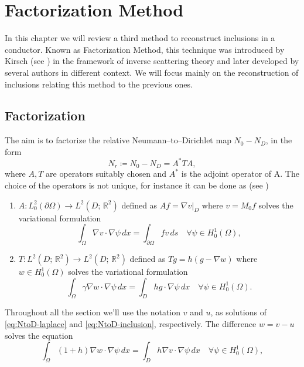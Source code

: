 \documentclass[10pt, a4paper, twoside, openright]{book}
\theoremstyle{definition}
\theoremstyle{plain}
\theoremstyle{plain}
\theoremstyle{plain}
\theoremstyle{plain}
\theoremstyle{plain}
\theoremstyle{plain}
\theoremstyle{plain}
\theoremstyle{plain}
\begin{document}
\chapter{Factorization Method}
\label{ch:factorization}
In this chapter we will review a third method to reconstruct inclusions in a conductor. Known as Factorization Method, 
this technique was introduced by Kirsch (see \cite{kirsch:factorization}) in the framework of inverse scattering theory and later developed by 
several authors in different context. We will focus mainly on the reconstruction of inclusions relating this method to 
the previous ones.
\section{Factorization}
The aim is to factorize the relative Neumann--to--Dirichlet map ${N_0} - {N_D}$, in the form
\begin{equation}
 {N_r}\coloneqq{N_0} - {N_D} = A^*TA,
\end{equation}
where $A,T$ are operators suitably chosen and $A^*$ is the adjoint operator of A. 
The choice of the operators is not unique, for instance it can be done as (see \cite{kirsch:book})
\begin{enumerate}
 \item $A:L^2_0(\partial \Omega) \to L^2(D;\,\mathbb{R}^2)$ defined as $Af = \nabla v|_D$ where $v = M_0f$ solves the variational formulation
 \begin{equation}
  \label{eq:def-A}
  \int_\Omega \nabla v\cdot \nabla \psi \, dx = \int_{\partial \Omega} fv\, ds\quad \forall\psi\in H^1_0(\Omega),
 \end{equation}
 \item $T:L^2(D;\,\mathbb{R}^2) \to L^2(D;\,\mathbb{R}^2)$ defined as $Tg = h(g - \nabla w)$ where $w\in H^1_0(\Omega)$ solves the variational formulation
 \begin{equation}
  \label{eq:def-T}
  \int_\Omega \gamma \nabla w\cdot \nabla \psi \, dx = \int_D hg\cdot\nabla\psi\, dx\quad \forall\psi\in H^1_0(\Omega).
 \end{equation}
\end{enumerate}
Throughout all the section we'll use the notation $v$ and $u$, as solutions of \eqref{eq:NtoD-laplace} and \eqref{eq:NtoD-inclusion}, respectively.
The difference $w = v - u$ solves the equation
\begin{equation}
 \int_\Omega(1+h)\nabla w\cdot\nabla\psi\, dx = \int_D h\nabla v \cdot \nabla \psi\, dx\quad \forall\psi\in H^1_0(\Omega),
\end{equation}
\end{document}
